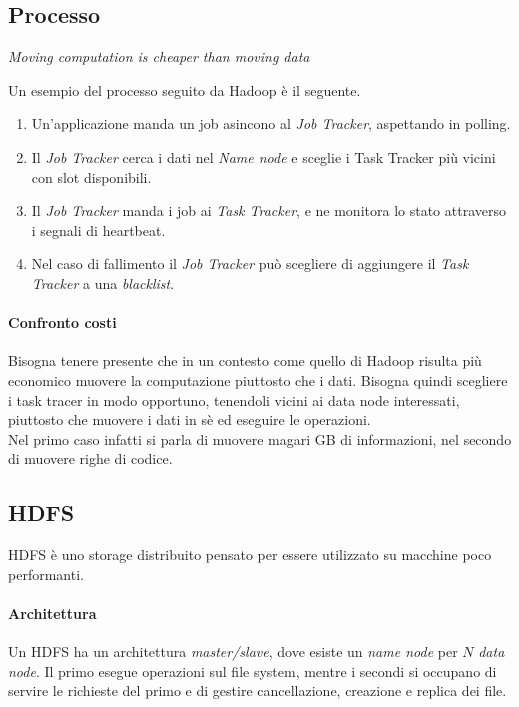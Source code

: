 \subsection{Processo}
\begin{center}
        \emph{Moving computation is cheaper than moving data}
\end{center}
Un esempio del processo seguito da Hadoop è il seguente.
\begin{enumerate}
        \item Un'applicazione manda un job asincono al \emph{Job Tracker}, aspettando in polling.
        \item Il \emph{Job Tracker} cerca i dati nel \emph{Name node} e sceglie i Task Tracker più vicini
        con slot disponibili.
        \item Il \emph{Job Tracker} manda i job ai \emph{Task Tracker}, e ne monitora 
        lo stato attraverso i segnali di heartbeat. 
        \item Nel caso di fallimento il \emph{Job Tracker}
        può scegliere di aggiungere il \emph{Task Tracker} a una \emph{blacklist}.
\end{enumerate}

\paragraph{Confronto costi}
Bisogna tenere presente che in un contesto come quello di Hadoop risulta 
più economico muovere la computazione piuttosto che i dati.
Bisogna quindi scegliere i task tracer in modo opportuno, tenendoli vicini ai 
data node interessati, piuttosto che muovere i dati in sè ed eseguire le operazioni.\\
Nel primo caso infatti si parla di muovere magari GB di informazioni, nel secondo di muovere 
righe di codice.

\subsection{HDFS}
HDFS è uno storage distribuito pensato per essere utilizzato su macchine poco
performanti.

\paragraph{Architettura}
Un HDFS ha un architettura \emph{master/slave}, dove esiste un \emph{name node} per $N$ \emph{data node}.
Il primo esegue operazioni sul file system, mentre i secondi si occupano di 
servire le richieste del primo e di gestire cancellazione, creazione e replica dei 
file.

